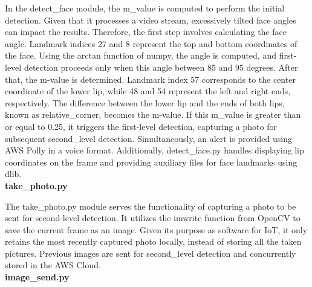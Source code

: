 In the detect\_face module, the m\_value is computed to perform the initial detection. Given that it processes a video stream, excessively tilted face angles can impact the results. Therefore, the first step involves calculating the face angle. Landmark indices 27 and 8 represent the top and bottom coordinates of the face. Using the arctan function of numpy, the angle is computed, and first-level detection proceeds only when this angle between 85 and 95 degrees. After that, the m-value is determined. Landmark index 57 corresponds to the center coordinate of the lower lip, while 48 and 54 represent the left and right ends, respectively. The difference between the lower lip and the ends of both lips, known as relative\_corner, becomes the m-value. If this m\_value is greater than or equal to 0.25, it triggers the first-level detection, capturing a photo for subsequent second\_level detection. Simultaneously, an alert is provided using AWS Polly in a voice format. Additionally, detect\_face.py handles displaying lip coordinates on the frame and providing auxiliary files for face landmarks using dlib.\\


\textbf{take\_photo.py}

The take\_photo.py module serves the functionality of capturing a photo to be sent for second-level detection. It utilizes the imwrite function from OpenCV to save the current frame as an image. Given its purpose as software for IoT, it only retains the most recently captured photo locally, instead of storing all the taken pictures. Previous images are sent for second\_level detection and concurrently stored in the AWS Cloud.\\

\textbf{image\_send.py}

